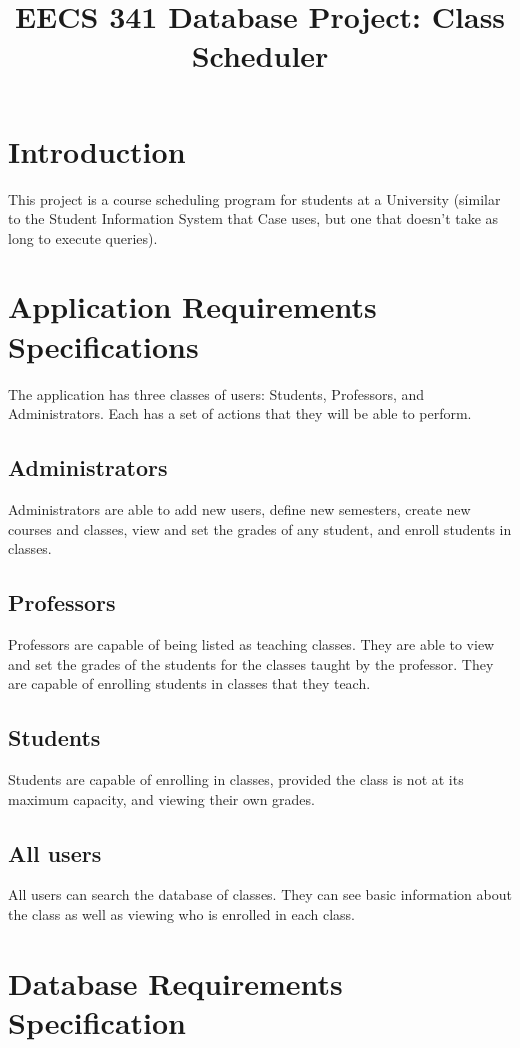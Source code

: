 \documentclass[11pt,oneside,a4paper]{article}
\title{EECS 341 Database Project: Class Scheduler}
\begin{document}
\maketitle
\tableofcontents
\section{Introduction}
This project is a course scheduling program for students at a University
(similar to the Student Information System that Case uses, but one that doesn't
take as long to execute queries).
\section{Application Requirements Specifications}
The application has three classes of users: Students, Professors, and
Administrators. Each has a set of actions that they will be able to perform.
\subsection{Administrators}
Administrators are able to add new users, define new semesters, create new
courses and classes, view and set the grades of any student, and enroll students in
classes.
\subsection{Professors}
Professors are capable of being listed as teaching classes. They are able to
view and set the grades of the students for the classes taught by the
professor. They are capable of enrolling students in classes that they teach.
\subsection{Students}
Students are capable of enrolling in classes, provided the class is not at its
maximum capacity, and viewing their own grades.
\subsection{All users}
All users can search the database of classes. They can see basic information
about the class as well as viewing who is enrolled in each class.

\section{Database Requirements Specification}
\end{document}

